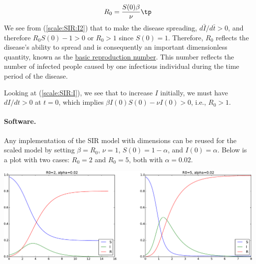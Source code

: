 \documentclass[graybox,envcountchap,sectrefs,final]{svmonodo}
\begin{document}
\begin{equation}
R_0 = \frac{S(0)\beta}{\nu}\tp
\end{equation}
We see from (\ref{scale:SIR:I2}) that to make the disease spreading,
$d\bar I/d\bar t >0$, and therefore $R_0 S(0) - 1 > 0$ or $R_0 > 1$
since $S(0)=1$.
Therefore, $R_0$ reflects the disease's ability to spread and is
consequently an important dimensionless quantity, known as the \href{{https://en.wikipedia.org/wiki/Basic_reproduction_number}}{basic
reproduction number}.
This number reflects the number of infected people caused by one infectious
individual during the time period of the disease.

Looking at (\ref{scale:SIR:I}), we see that to increase $I$ initially,
we must have $dI/dt >0$ at $t=0$, which implies
$\beta I(0)S(0) - \nu I(0) >0$, i.e., $R_0 > 1$.

\paragraph{Software.}
Any implementation of the SIR model with dimensions can be reused for
the scaled model by setting $\beta = R_0$, $\nu = 1$, $S(0)=1-\alpha$,
and $I(0)=\alpha$. Below is a plot with two cases: $R_0=2$ and $R_0=5$,
both with $\alpha=0.02$.



\vspace{3mm}




\vspace{3mm}





\centerline{\includegraphics[width=1.0\linewidth]{fig-scaling/SIR1.pdf}}





\vspace{3mm}




\vspace{3mm}
\end{document}
